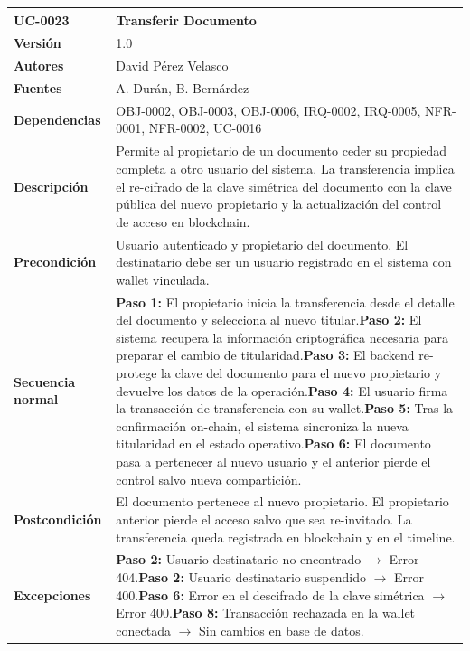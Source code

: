\documentclass[11pt, a4paper]{article}
\begin{document}
\begin{longtable}{|p{4cm}|p{10cm}|}
\hline
\textbf{UC-0023} & Transferir Documento \\
\hline
\textbf{Versión} & 1.0 \\
\hline
\textbf{Autores} & David Pérez Velasco \\
\hline
\textbf{Fuentes} & A. Durán, B. Bernárdez \\
\hline
\textbf{Dependencias} & OBJ-0002, OBJ-0003, OBJ-0006, IRQ-0002, IRQ-0005, NFR-0001, NFR-0002, UC-0016 \\
\hline
\textbf{Descripción} & Permite al propietario de un documento ceder su propiedad completa a otro usuario del sistema. La transferencia implica el re-cifrado de la clave simétrica del documento con la clave pública del nuevo propietario y la actualización del control de acceso en blockchain. \\
\hline
\textbf{Precondición} & Usuario autenticado y propietario del documento. El destinatario debe ser un usuario registrado en el sistema con wallet vinculada. \\
\hline
\textbf{Secuencia normal} & \textbf{Paso 1:} El propietario inicia la transferencia desde el detalle del documento y selecciona al nuevo titular.\newline\textbf{Paso 2:} El sistema recupera la información criptográfica necesaria para preparar el cambio de titularidad.\newline\textbf{Paso 3:} El backend re-protege la clave del documento para el nuevo propietario y devuelve los datos de la operación.\newline\textbf{Paso 4:} El usuario firma la transacción de transferencia con su wallet.\newline\textbf{Paso 5:} Tras la confirmación on-chain, el sistema sincroniza la nueva titularidad en el estado operativo.\newline\textbf{Paso 6:} El documento pasa a pertenecer al nuevo usuario y el anterior pierde el control salvo nueva compartición. \\
\hline
\textbf{Postcondición} & El documento pertenece al nuevo propietario. El propietario anterior pierde el acceso salvo que sea re-invitado. La transferencia queda registrada en blockchain y en el timeline. \\
\hline
\textbf{Excepciones} & \textbf{Paso 2:} Usuario destinatario no encontrado $\rightarrow$ Error 404.\newline\textbf{Paso 2:} Usuario destinatario suspendido $\rightarrow$ Error 400.\newline\textbf{Paso 6:} Error en el descifrado de la clave simétrica $\rightarrow$ Error 400.\newline\textbf{Paso 8:} Transacción rechazada en la wallet conectada $\rightarrow$ Sin cambios en base de datos. \\

\end{longtable}
\end{document}
